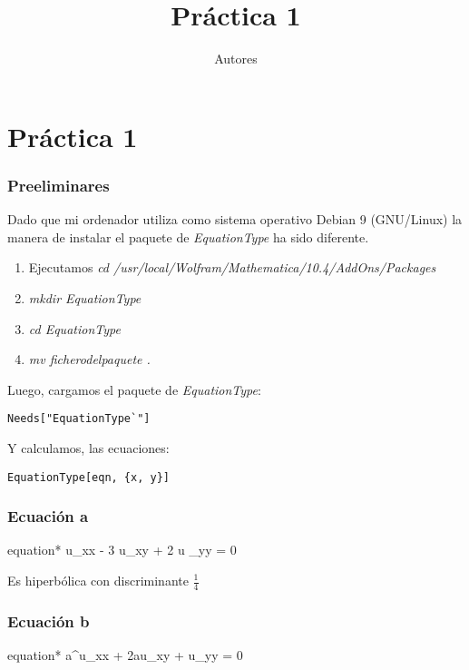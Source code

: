 \documentclass[twoside,11pt]{TrabajosTex}
\title{Práctica 1}
\author{Autores}
\begin{document}
	\maketitle
	
	\section{Práctica 1}
	
	\subsubsection{Preeliminares}
	Dado que mi ordenador utiliza como sistema operativo Debian 9 (GNU/Linux) la manera de instalar el paquete de \textit{EquationType} ha sido diferente.
	
	\begin{enumerate}
		\item Ejecutamos \textit{cd /usr/local/Wolfram/Mathematica/10.4/AddOns/Packages}
		\item \textit{mkdir EquationType}
		\item \textit{cd EquationType}
		\item \textit{mv ficherodelpaquete .}
	\end{enumerate}

	Luego, cargamos el paquete de \textit{EquationType}:
	
	\begin{lstlisting}
Needs["EquationType`"]
	\end{lstlisting}
	
	Y calculamos, las ecuaciones:
	
	\begin{lstlisting}
EquationType[eqn, {x, y}]
	\end{lstlisting}
	\subsubsection{Ecuación a}
	\begin{empheq}[box={\mybluebox[5pt]}]{equation*}
		u_{xx} - 3 u_{xy} + 2 u _{yy} = 0
	\end{empheq}
	
	Es hiperbólica con discriminante $\frac{1}{4}$
	\subsubsection{Ecuación b}
	\begin{empheq}[box={\mybluebox[5pt]}]{equation*}
		a^u_{xx} + 2au_{xy} + u_{yy} = 0
	\end{empheq}
	
\end{document}
